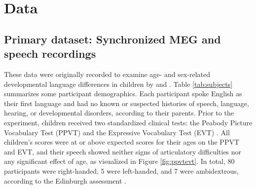 \documentclass[utf8]{frontiersSCNS} %
\begin{document}

\section{Data}

\subsection{Primary dataset: Synchronized MEG and speech recordings}

These data were originally recorded to examine age- and sex-related developmental language differences in children by \cite{Doesburg2016} and \cite{Yu2014}. Table \ref{tab:subjects} summarizes some participant demographics. Each participant spoke English as their first language and had no known or suspected histories of speech, language, hearing, or developmental disorders, according to their parents. Prior to the experiment, children received two standardized clinical tests: the Peabody Picture Vocabulary Test (PPVT) \cite{Dunn97} and the Expressive Vocabulary Test (EVT) \cite{EVT}. All children's scores were at or above expected scores for their ages on the PPVT and EVT, and their speech showed neither signs of articulatory difficulties nor any significant effect of age, as visualized in Figure \ref{fig:ppvtevt}. In total, 80 participants were right-handed, 5 were left-handed, and 7 were ambidextrous, according to the Edinburgh assessment \cite{Oldfield}. %
\end{document}
